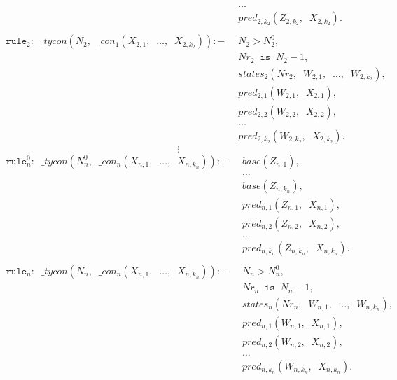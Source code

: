 \documentclass{report}
\theoremstyle{definition}
\theoremstyle{definition}
\newcommand{\ttt}[1]{\texttt{#1}}
\newcommand{\tav}{\;\;}
\begin{document}
\begin{align*}
	  & \tav \ldots \tav                                                &   &   \\
	  & \tav pred_{2, k_2}(Z_{2,k_2}, \tav X_{2,k_2}).                  &   &   \\
	\\
	\ttt{rule}_2: \tav \_ tycon (N_2, \tav \_ con_1(X_{2,1}, \tav \ldots, \tav X_{2,k_2})) :-
	  & \tav N_2 > N_{2}^{0},                                           &   &   \\
	  & \tav Nr_2 \tav \ttt{is} \tav N_2 - 1,                           &   &   \\
	  & \tav states_2(Nr_2, \tav W_{2,1}, \tav \ldots, \tav W_{2,k_2}), &   &   \\
	  & \tav pred_{2, 1}(W_{2,1}, \tav X_{2,1}),                        &   &   \\
	  & \tav pred_{2, 2}(W_{2,2}, \tav X_{2,2}),                        &   &   \\
	  & \tav \ldots \tav                                                &   &   \\
	  & \tav pred_{2, k_2}(W_{2,k_2}, \tav X_{2,k_2}).                  &   &   
\end{align*}
$$\vdots$$
\begin{align*}
	\ttt{rule}_{n}^{0}: \tav \_ tycon (N_{n}^{0}, \tav \_ con_n(X_{n,1}, \tav \ldots, \tav X_{n,k_n})) :-
	  & \tav base(Z_{n,1}),                                             &   &   \\
	  & \tav \ldots                                                     &   &   \\
	  & \tav base(Z_{n,k_n}),                                           &   &   \\
	  & \tav pred_{n, 1}(Z_{n,1}, \tav X_{n,1}),                        &   &   \\
	  & \tav pred_{n, 2}(Z_{n,2}, \tav X_{n,2}),                        &   &   \\
	  & \tav \ldots \tav                                                &   &   \\
	  & \tav pred_{n, k_n}(Z_{n,k_n}, \tav X_{n,k_n}).                  &   &   \\
	\\
	\ttt{rule}_n: \tav \_ tycon (N_n, \tav \_ con_n(X_{n,1}, \tav \ldots, \tav X_{n,k_n})) :-
	  & \tav N_n > N_{n}^{0},                                           &   &   \\
	  & \tav Nr_n \tav \ttt{is} \tav N_n - 1,                           &   &   \\
	  & \tav states_n(Nr_n, \tav W_{n,1}, \tav \ldots, \tav W_{n,k_n}), &   &   \\
	  & \tav pred_{n, 1}(W_{n,1}, \tav X_{n,1}),                        &   &   \\
	  & \tav pred_{n, 2}(W_{n,2}, \tav X_{n,2}),                        &   &   \\
	  & \tav \ldots \tav                                                &   &   \\
	  & \tav pred_{n, k_n}(W_{n,k_n}, \tav X_{n,k_n}).                  &   &   \\
\end{align*}
\end{document}
